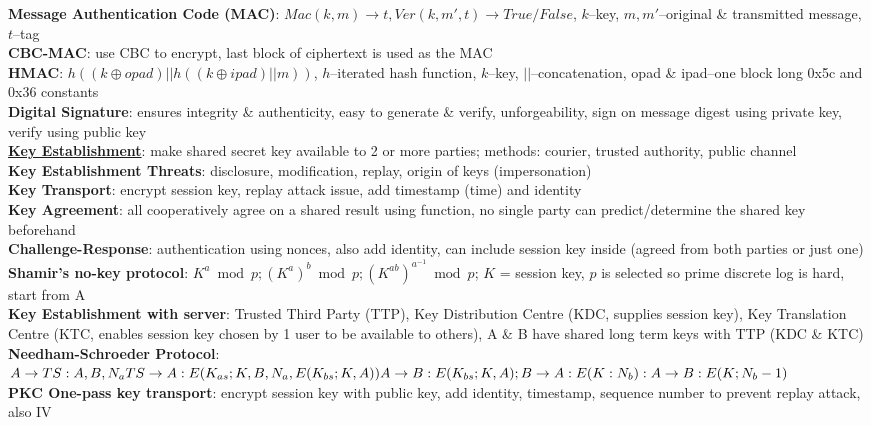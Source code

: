 \documentclass[a4paper]{article}
\begin{document}
\begin{multicols}{2}
        \textbf{Message Authentication Code (MAC)}: $Mac(k,m) \to t, Ver(k,m',t) \to True/False$, $k$--key, $m,m'$--original \& transmitted message, $t$--tag\\
        \textbf{CBC-MAC}: use CBC to encrypt, last block of ciphertext is used as the MAC\\
        \textbf{HMAC}: $h((k \oplus opad) || h((k \oplus ipad) || m))$, $h$--iterated hash function, $k$--key, $||$--concatenation, opad \& ipad--one block long 0x5c and 0x36 constants\\
        \textbf{Digital Signature}: ensures integrity \& authenticity, easy to generate \& verify, unforgeability, sign on message digest using private key, verify using public key\\
        \underline{\textbf{Key Establishment}}: make shared secret key available to 2 or more parties; methods: courier, trusted authority, public channel\\
        \textbf{Key Establishment Threats}: disclosure, modification, replay, origin of keys (impersonation)\\
        \textbf{Key Transport}: encrypt session key, replay attack issue, add timestamp (time) and identity\\
        \textbf{Key Agreement}: all cooperatively agree on a shared result using function, no single party can predict/determine the shared key beforehand\\
        \textbf{Challenge-Response}: authentication using nonces, also add identity, can include session key inside (agreed from both parties or just one)\\
        \textbf{Shamir's no-key protocol}: $K^a \bmod p;{(K^a)}^b \bmod p; {(K^{ab})}^{a^{-1}}\bmod p$; $K$ = session key, $p$ is selected so prime discrete log is hard, start from A\\
        \textbf{Key Establishment with server}: Trusted Third Party (TTP), Key Distribution Centre (KDC, supplies session key), Key Translation Centre (KTC, enables session key chosen by 1 user to be available to others), A \& B have shared long term keys with TTP (KDC \& KTC)\\
        \textbf{Needham-Schroeder Protocol}: $A \to TS: A, B, N_a\\TS \to A: E(K_{as}; K, B, N_a, E(K_{bs}; K, A))\\A \to B: E(K_{bs}; K, A); B \to A: E(K: N_b): A \to B: E(K; N_b - 1)$\\
        \textbf{PKC One-pass key transport}: encrypt session key with public key, add identity, timestamp, sequence number to prevent replay attack, also IV\\

\end{multicols}
\end{document}
